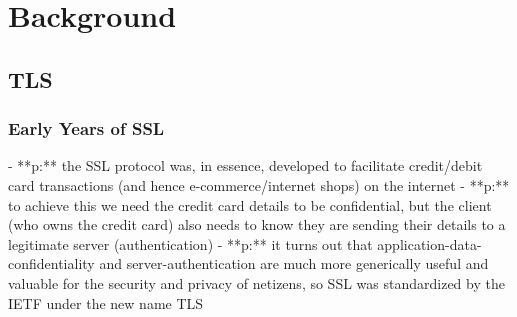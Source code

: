\chapter{Background}

\section{TLS}
\subsection{Early Years of SSL}
      - **p:** the SSL protocol was, in essence, developed to facilitate credit/debit card transactions (and hence e-commerce/internet shops) on the internet
      - **p:** to achieve this we need the credit card details to be confidential, but the client (who owns the credit card) also needs to know they are sending their details to a legitimate server (authentication) 
      - **p:** it turns out that application-data-confidentiality and server-authentication are much more generically useful and valuable for the security and privacy of netizens, so SSL was standardized by the IETF under the new name TLS
